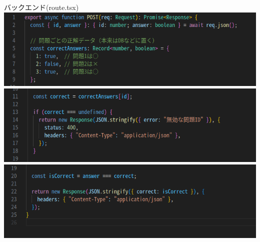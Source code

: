 \documentclass[aspectratio=169]{beamer}
\begin{document}
\begin{frame}[allowframebreaks]{バックエンド(route.tsx)}
    \includegraphics[scale=0.6]{check1.png}
    \includegraphics[scale=0.6]{check2.png}
    \includegraphics[scale=0.6]{check3.png}
\end{frame}
\end{document}
